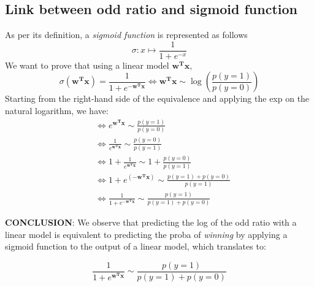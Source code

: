 \documentclass{article}
\begin{document}
\subsection{Link between odd ratio and sigmoid function}
As per its definition, a \textit{sigmoid function} is represented as follows
\[
\sigma :x \mapsto \frac{1}{1 + e^{-x}}
\]
We want to prove that using a linear model $\mathbf{w^Tx}$,
\[
\sigma(\mathbf{w^Tx})=\frac{1}{1 + e^{-\mathbf{w^Tx}}} \Longleftrightarrow \mathbf{w^Tx} \sim \log(\frac{p(y=1)}{p(y=0)})
\]
Starting from the right-hand side of the equivalence and applying the exp on the natural logarithm, we have:
\[
\begin{split}
& \Longleftrightarrow e^{\mathbf{w^Tx}} \sim \frac{p(y=1)}{p(y=0)}\\
& \Longleftrightarrow \frac{1}{e^{\mathbf{w^Tx}}} \sim \frac{p(y=0)}{p(y=1)} \\
& \Longleftrightarrow 1 + \frac{1}{e^{\mathbf{w^Tx}}}\sim 1 + \frac{p(y=0)}{p(y=1)} \\
& \Longleftrightarrow 1 + e^{(-\mathbf{w^Tx})} \sim \frac{p(y=1)+p(y=0)}{p(y=1)} \\
& \Longleftrightarrow \frac{1}{1 + e^{\mathbf{-w^Tx}}} \sim \frac{p(y=1)}{p(y=1) + p(y=0)}
\end{split}
\]

\textbf{CONCLUSION}: We observe that predicting the log of the odd ratio with a linear model is equivalent to predicting the proba of \textit{winning} by applying a sigmoid function to the output of a linear model, which translates to:

\begin{equation} \label{eq4}
\boxed{
\frac{1}{1 + e^{\mathbf{w^Tx}}} \sim \frac{p(y=1)}{p(y=1) + p(y=0)}
}
\end{equation}
\end{document}
